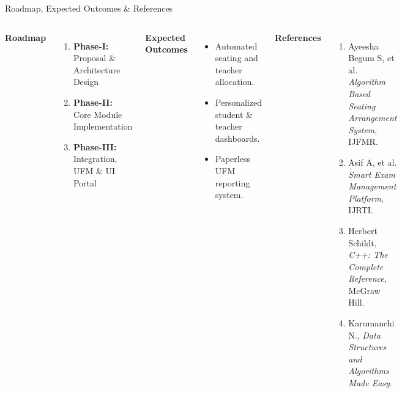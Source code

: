 \documentclass[aspectratio=169,11pt]{beamer}
\begin{document}
\begin{frame}{Roadmap, Expected Outcomes \& References}
\begin{columns}[T,totalwidth=\textwidth]
\textbf{\color{GEUBlue}Roadmap}
\begin{enumerate}\itemsep3pt
\item \textbf{Phase-I:} Proposal \& Architecture Design
\item \textbf{Phase-II:} Core Module Implementation
\item \textbf{Phase-III:} Integration, UFM \& UI Portal
\end{enumerate}
\vspace{2mm}
\textbf{\color{GEUBlue}Expected Outcomes}
\begin{itemize}\itemsep2pt
\scriptsize
\item Automated seating and teacher allocation.
\item Personalized student \& teacher dashboards.
\item Paperless UFM reporting system.
\end{itemize}
\textbf{\color{GEUBlue}References}
\begin{enumerate}\itemsep2pt
\scriptsize
\item Ayeesha Begum S, et al. \textit{Algorithm Based Seating Arrangement System}, IJFMR.
\item Asif A, et al. \textit{Smart Exam Management Platform}, IJRTI.
\item Herbert Schildt, \textit{C++: The Complete Reference}, McGraw Hill.
\item Karumanchi N., \textit{Data Structures and Algorithms Made Easy}.
\end{enumerate}
\vfill
\end{columns}
\end{frame}
\end{document}
